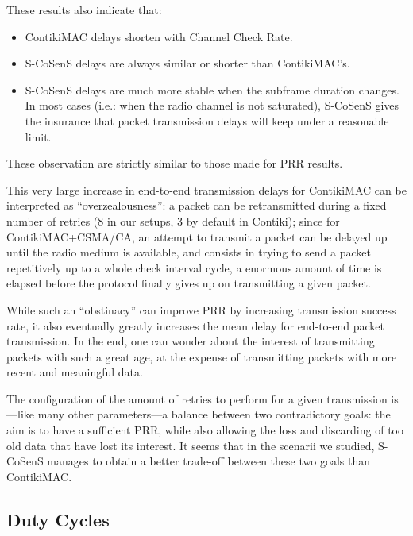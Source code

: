 \documentclass[conference]{IEEEtran}
\begin{document}
These results also indicate that:

\begin{itemize}

\item ContikiMAC delays shorten with Channel Check Rate.

\item S-CoSenS delays are always similar or shorter than ContikiMAC's.

\item S-CoSenS delays are much more stable when the subframe duration
      changes. In most cases (i.e.: when the radio channel is not saturated),
      S-CoSenS gives the insurance that packet transmission delays will keep
      under a reasonable limit.

\end{itemize}

These observation are strictly similar to those made for PRR results.

This very large increase in end-to-end transmission delays for ContikiMAC
can be interpreted as ``overzealousness'': a packet can be retransmitted
during a fixed number of retries (8 in our setups, 3 by default in Contiki);
since for ContikiMAC+CSMA/CA, an attempt to transmit a packet can be delayed
up until the radio medium is available, and consists in trying to send
a packet repetitively up to a whole check interval cycle, a enormous
amount of time is elapsed before the protocol finally gives up
on transmitting a given packet.

While such an ``obstinacy'' can improve PRR by increasing transmission
success rate, it also eventually greatly increases the mean delay for
end-to-end packet transmission. In the end, one can wonder about the
interest of transmitting packets with such a great age, at the expense
of transmitting packets with more recent and meaningful data.

The configuration of the amount of retries to perform for a given
transmission is---like many other parameters---a balance between two
contradictory goals: the aim is to have a sufficient PRR, while also
allowing the loss and discarding of too old data that have lost its
interest. It seems that in the scenarii we studied, S-CoSenS manages
to obtain a better trade-off between these two goals than ContikiMAC.


\subsection{Duty Cycles}
\end{document}
